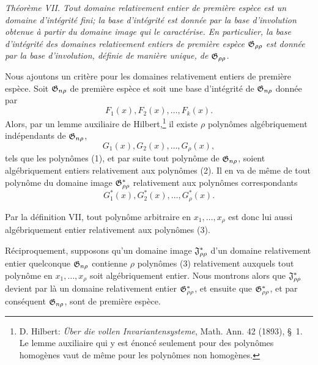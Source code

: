 \emph{Théorème VII. Tout domaine relativement entier de première espèce est un domaine d’intégrité fini; la base d'intégrité est donnée par la base d'involution obtenue à partir du domaine image qui le caractérise. En particulier, la base d'intégrité des domaines relativement entiers de première espèce $\mathfrak{G}_{\rho\rho}$ est donnée par la base d'involution, définie de manière unique, de $\mathfrak{G}_{\rho\rho}$.}

Nous ajoutons un critère pour les domaines relativement entiers de première espèce. Soit $\mathfrak{G}_{n\rho}$ de première espèce et soit une base d'intégrité de $\mathfrak{G}_{n\rho}$ donnée par
\begin{equation}
  F_1(x),F_2(x),\ldots,F_k(x).
\tag{1}
\end{equation}
Alors, par un lemme auxiliaire de Hilbert,\footnote{D. Hilbert: \emph{Über die vollen Invariantensysteme}, Math. Ann. 42 (1893), \S\ 1. Le lemme auxiliaire qui y est énoncé seulement pour des polynômes homogènes vaut de même pour les polynômes non homogènes.} il existe $\rho$ polynômes algébriquement indépendants de $\mathfrak{G}_{n\rho}$,
\begin{equation}
  G_1(x),G_2(x),\ldots,G_\rho(x),
\tag{2}
\end{equation}
tels que les polynômes (1), et par suite tout polynôme de $\mathfrak{G}_{n\rho}$, soient algébriquement entiers relativement aux polynômes (2). Il en va de même de tout polynôme du domaine image $\mathfrak{G}^*_{\rho\rho}$ relativement aux polynômes correspondants
\begin{equation}
  G_1^*(x),G_2^*(x),\ldots,G_\rho^*(x).
\tag{3}
\end{equation}

Par la définition VII, tout polynôme arbitraire en $x_1,\ldots,x_\rho$ est donc lui aussi algébriquement entier relativement aux polynômes (3).

Réciproquement, supposons qu'un domaine image $\mathfrak{J}^*_{\rho\rho}$ d'un domaine relativement entier quelconque $\mathfrak{G}_{n\rho}$ contienne $\rho$ polynômes (3) relativement auxquels tout polynôme en $x_1,\ldots,x_\rho$ soit algébriquement entier. Nous montrons alors que $\mathfrak{J}^*_{\rho\rho}$ devient par là un domaine relativement entier $\mathfrak{G}^*_{\rho\rho}$, et ensuite que $\mathfrak{G}^*_{\rho\rho}$, et par conséquent $\mathfrak{G}_{n\rho}$, sont de première espèce.

